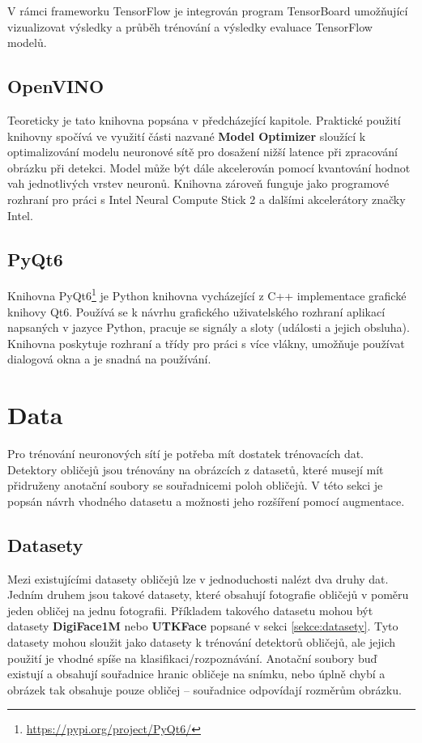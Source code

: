 V rámci frameworku TensorFlow je integrován program TensorBoard umožňující vizualizovat výsledky a průběh trénování a výsledky evaluace TensorFlow modelů.

\subsection*{OpenVINO}
Teoreticky je tato knihovna popsána v předcházející kapitole. Praktické použití knihovny spočívá ve využití části nazvané \textbf{Model Optimizer} sloužící k optimalizování modelu neuronové sítě pro dosažení nižší latence při zpracování obrázku při detekci. Model může být dále akcelerován pomocí kvantování hodnot vah jednotlivých vrstev neuronů. Knihovna zároveň funguje jako programové rozhraní pro práci s Intel Neural Compute Stick 2 a dalšími akcelerátory značky Intel.

\subsection*{PyQt6}
Knihovna PyQt6\footnote{\url{https://pypi.org/project/PyQt6/}} je Python knihovna vycházející z C++ implementace grafické knihovy Qt6. Používá se k návrhu grafického uživatelského rozhraní aplikací napsaných v jazyce Python, pracuje se signály a sloty (události a jejich obsluha). Knihovna poskytuje rozhraní a třídy pro práci s více vlákny, umožňuje používat dialogová okna a je snadná na používání.


\section{Data}
\label{sekce:data_navrh}
Pro trénování neuronových sítí je potřeba mít dostatek trénovacích dat. Detektory obličejů jsou trénovány na obrázcích z datasetů, které musejí mít přidruženy anotační soubory se souřadnicemi poloh obličejů. V této sekci je popsán návrh vhodného datasetu a možnosti jeho rozšíření pomocí augmentace.

\subsection*{Datasety}
Mezi existujícími datasety obličejů lze v jednoduchosti nalézt dva druhy dat. Jedním druhem jsou takové datasety, které obsahují fotografie obličejů v poměru jeden obličej na jednu fotografii. Příkladem takového datasetu mohou být datasety \textbf{DigiFace1M} nebo \textbf{UTKFace} popsané v sekci \ref{sekce:datasety}. Tyto datasety mohou sloužit jako datasety k trénování detektorů obličejů, ale jejich použití je vhodné spíše na klasifikaci/rozpoznávání. Anotační soubory buď existují a obsahují souřadnice hranic obličeje na snímku, nebo úplně chybí a obrázek tak obsahuje pouze obličej -- souřadnice odpovídají rozměrům obrázku.

